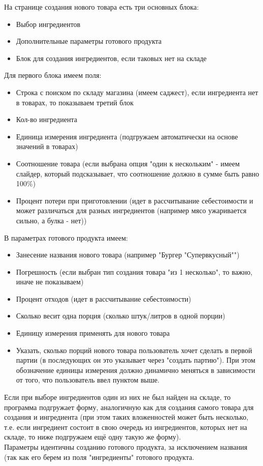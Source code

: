 \documentclass[DIV=calc, paper=a4, fontsize=11pt]{scrartcl} %
\begin{document}
На странице создания нового товара есть три основных блока:
\begin{itemize}
	\item Выбор ингредиентов
	\item Дополнительные параметры готового продукта
	\item Блок для создания ингредиентов, если таковых нет на складе
\end{itemize}

Для первого блока имеем поля:

\begin{itemize}
	\item Строка с поиском по складу магазина (имеем саджест), если ингредиента нет в товарах, то показываем третий блок
	\item Кол-во ингредиента
	\item Единица измерения ингредиента (подгружаем автоматически на основе значений в товарах)
	\item Соотношение товара (если выбрана опция "один к нескольким" - имеем слайдер, который подсказывает, что соотношение должно в сумме быть равно 100\%)
	\item Процент потери при приготовлении (идет в рассчитывание себестоимости и может различаться для разных ингредиентов (например мясо ужаривается сильно, а булка - нет))
\end{itemize}

В параметрах готового продукта имеем:

\begin{itemize}
	\item Занесение названия нового товара (например "Бургер "Супервкусный"")
	\item Погрешность (если выбран тип создания товара "из 1 несколько", то важно, иначе не показываем)
	\item Процент отходов (идет в рассчитывание себестоимости)
	\item Сколько весит одна порция (сколько штук/литров в одной порции)
	\item Единицу измерения применять для нового товара
	\item Указать, сколько порций нового товара пользователь хочет сделать в первой партии (в последующих он это указывает через "создать партию"). При этом обозначение единицы измерения должно динамично меняться в зависимости от того, что пользователь ввел пунктом выше.
\end{itemize}

Если при выборе ингредиентов один из них не был найден на складе, то программа подгружает форму, аналогичную как для создания самого товара для создания и ингредиента (при этом таких вложенностей может быть несколько, т.е. если ингредиент состоит в свою очередь из ингредиентов, которых нет на складе, то ниже подгружаем ещё одну такую же форму).
\\[0.5cm]
Параметры идентичны созданию готового продукта, за исключением названия (так как его берем из поля "ингредиенты" готового продукта.
\end{document}
